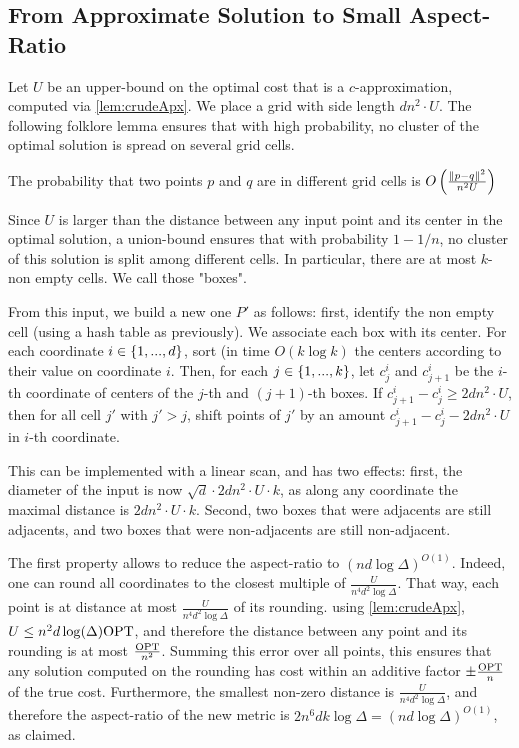 \subsection{From Approximate Solution to Small Aspect-Ratio}
Let $U$ be an upper-bound on the optimal cost that is a $c$-approximation, computed via \cref{lem:crudeApx}. We place a grid with side length $d n^2\cdot U$.
The following folklore lemma ensures that with high probability, no cluster of the optimal solution is spread on several grid cells.

\begin{lemma}
The probability that two points $p$ and $q$ are in different grid cells is $O\left( \frac{\|p-q\|^2}{n^2 U}\right)$
\end{lemma}
Since $U$ is larger than the distance between any input point and its center in the optimal solution, a union-bound ensures that with probability $1-1/n$, no cluster of this solution is split among different cells.
In particular, there are at most $k$-non empty cells. We call those "boxes".

From this input, we build a new one $P'$ as follows: first, identify the non empty cell (using a hash table as previously). We associate each box with its center.
For each coordinate $i \in \left\{ 1, ..., d \right\}$, sort (in time $O(k \log k)$ the centers according to their value on coordinate $i$. Then, for each $j \in \left\{ 1, ..., k\right\}$, let $c^i_j$ and $c^i_{j+1}$ be the $i$-th coordinate of centers of the $j$-th and $(j+1)$-th boxes. If $c^i_{j+1} - c^i_j \geq 2d n^2\cdot U$, then for all cell $j'$ with $j' > j$, shift points  of $j'$ by an amount $c^i_{j+1} - c^i_j - 2d n^2\cdot U$ in $i$-th coordinate.


This can be implemented with a linear scan, and has two effects: first, the diameter of the input is now $\sqrt{d} \cdot 2d n^2\cdot U \cdot k$, as along any coordinate the maximal distance is $2d n^2\cdot U \cdot k$. Second, two boxes that were adjacents are still adjacents, and two boxes that were non-adjacents are still non-adjacent.

The first property allows to reduce the aspect-ratio to $(nd \log \Delta)^{O(1)}$. Indeed, one can round all coordinates to the closest multiple of $\frac{U}{n^4 d^{2} \log \Delta}$. That way, each point is at distance at most $\frac{U}{n^4 d^{2} \log \Delta}$ of its rounding. using \cref{lem:crudeApx}, $U \leq n^2 d \log(\Delta) \text{OPT}$, and therefore the distance between any point and its rounding is at most $\frac{\text{OPT}}{n^2}$. Summing this error over all points, this ensures that any solution computed on the rounding has cost within an additive factor $\pm \frac{\text{OPT}}{n}$ of the true cost. Furthermore, the smallest non-zero distance is $\frac{U}{n^4 d^{2} \log \Delta}$, and therefore the aspect-ratio of the new metric is $2 n^6 d k \log \Delta = (nd \log \Delta)^{O(1)}$, as claimed.

